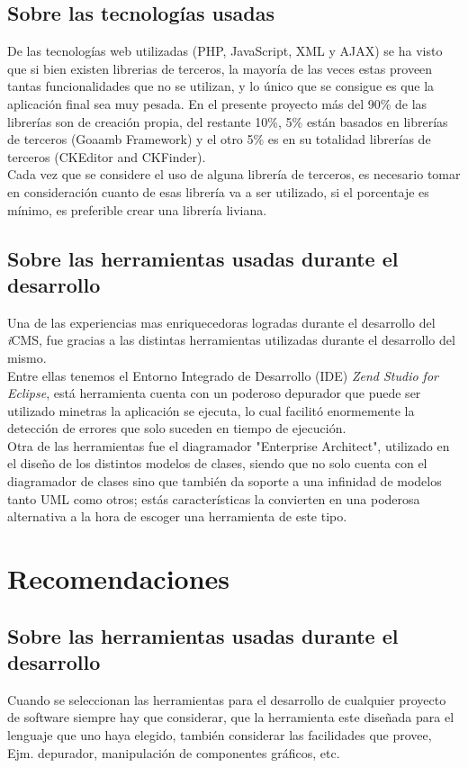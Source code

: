 \subsection{Sobre las tecnolog\'ias usadas}
De las tecnolog\'ias web utilizadas (PHP, JavaScript, XML y AJAX) se ha visto que si bien existen librerias de terceros, la mayor\'ia de las veces estas proveen tantas funcionalidades que no se utilizan, y lo \'unico que se consigue es que la aplicaci\'on final sea muy pesada. En el presente proyecto m\'as del 90\% de las librer\'ias son de creaci\'on propia, del restante 10\%, 5\% est\'an basados en librer\'ias de terceros (Goaamb Framework) y el otro 5\% es en su totalidad librer\'ias de terceros (CKEditor and CKFinder).\\
Cada vez que se considere el uso de alguna librer\'ia de terceros, es necesario tomar en consideraci\'on cuanto de esas librer\'ia va a ser utilizado, si el porcentaje es m\'inimo, es preferible crear una librer\'ia liviana. 

\subsection{Sobre las herramientas usadas durante el desarrollo}
Una de las experiencias mas enriquecedoras logradas durante el desarrollo del \textit{i}CMS, fue gracias a las distintas herramientas utilizadas durante el desarrollo del mismo.\\ Entre ellas tenemos el Entorno Integrado de Desarrollo (IDE) \emph{Zend Studio for Eclipse}, est\'a herramienta cuenta con un poderoso depurador que puede ser utilizado minetras la aplicaci\'on se ejecuta, lo cual facilit\'o enormemente la detecci\'on de errores que solo suceden en tiempo de ejecuci\'on.\\
Otra de las herramientas fue el diagramador "Enterprise Architect", utilizado en el dise\~no de los distintos modelos de clases, siendo que no solo cuenta con el diagramador de clases sino que tambi\'en da soporte a una infinidad de modelos tanto UML como otros; est\'as caracter\'isticas la convierten en una poderosa alternativa a la hora de escoger una herramienta de este tipo.

\section{Recomendaciones}

\subsection{Sobre las herramientas usadas durante el desarrollo}
Cuando se seleccionan las herramientas para el desarrollo de cualquier proyecto de software siempre hay que considerar, que la herramienta este dise\~nada para el lenguaje que uno haya elegido, tambi\'en considerar las facilidades que provee, Ejm. depurador, manipulaci\'on de componentes gr\'aficos, etc.

